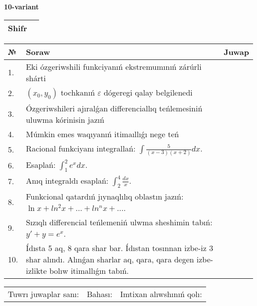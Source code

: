 \documentclass{article}
\begin{document}
  \egroup
  
  \newpage
  
  
  \textbf{10-variant}\\
  
  \bgroup
  \def\arraystretch{1.6} %
  
  \begin{tabular}{|m{5.7cm}|m{9.5cm}|}
  \hline
  Shifr & \\
  \hline
  \end{tabular}
  
  \vspace{1cm}
  
  \begin{tabular}{|m{0.7cm}|m{10cm}|m{4cm}|}
  \hline
  № & Soraw & Juwap \\
  \hline
  1. & Eki ózgeriwshili funkciyanıń ekstremumınıń zárúrli shárti &  \\
  \hline
  2. & \((x_0,y_0)\) tochkanıń \(\varepsilon\) dógeregi qalay belgilenedi &  \\
  \hline
  3. & Ózgeriwshileri ajıralǵan differenciallıq teńlemesiniń uluwma kórinisin jazıń &  \\
  \hline
  4. & Múmkin emes waqıyanıń itimaıllıǵı nege teń &  \\
  \hline
  5. & Racional funkciyanı integrallań: \(\int{\frac{5}{(x - 3)(x + 2)}dx}\). &  \\
  \hline
  6. & Esaplań: \(\int_{1}^2 {e^{x}dx}\). &  \\
  \hline
  7. & Anıq integraldı esaplań: \(\int_{2}^{4}\frac{dx}{x}\). &  \\
  \hline
  8. & Funkcional qatardıń jıynaqlılıq oblastın jazıń: \(\ln x + ln^2 x + ... + ln^{n}x + ...\). &  \\
  \hline
  9. & Sızıqlı differencial teńlemeniń ulwma sheshimin tabıń: \(y' + y = e^{x}\). &  \\
  \hline
  10. & Ídısta 5 aq, 8 qara shar bar. Ídıstan tosınnan izbe-iz 3 shar alındı. Alınǵan sharlar aq, qara, qara degen izbe-izlikte bolıw itimallıǵın tabıń. &  \\
  \hline
  \end{tabular}
  
  \vspace{1cm}
  
  \begin{tabular}{lll}
  Tuwrı juwaplar sanı: \underline{\hspace{1.5cm}} & 
  Bahası: \underline{\hspace{1.5cm}} & 
  Imtixan alıwshınıń qolı: \underline{\hspace{2cm}} \\
  \end{tabular}
  
\end{document}
